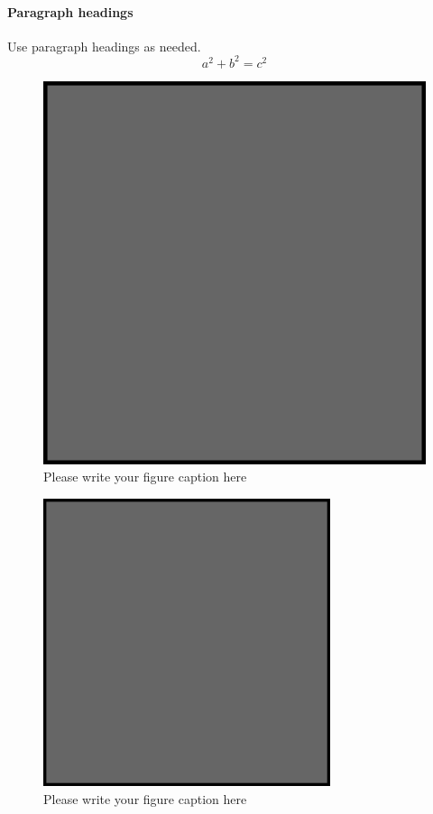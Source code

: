 \paragraph{Paragraph headings} Use paragraph headings as needed.
\begin{equation}
a^2+b^2=c^2
\end{equation}

\begin{figure}
  \includegraphics{example.eps}
\caption{Please write your figure caption here}
\label{fig:1}       %
\end{figure}
%
\begin{figure}
  \includegraphics[width=0.75\textwidth]{example.eps}
\caption{Please write your figure caption here}
\label{fig:2}       %
\end{figure}
